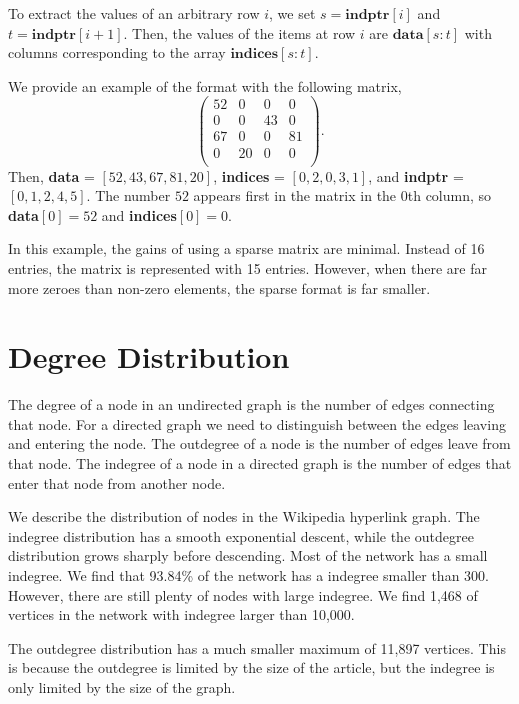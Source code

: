 \documentclass{article}
\begin{document}
To extract the values of an arbitrary row $i$, we set $s = \textbf{indptr}[i]$ and $t = \textbf{indptr}[i+1]$. Then, the values of the items at row $i$ are $\textbf{data}[s:t]$ with columns corresponding to the array $\textbf{indices}[s:t]$. 

We provide an example of the format with the following matrix,
\begin{equation*}
    \begin{pmatrix}
        52 & 0  & 0  & 0  \\
        0  & 0  & 43 & 0  \\
        67 & 0  & 0  & 81  \\
        0  & 20 & 0  & 0  \\
    \end{pmatrix}.
\end{equation*}
Then, \textbf{data} = $[52, 43, 67, 81, 20]$, \textbf{indices} = $[0, 2, 0, 3, 1]$, and \textbf{indptr} = $[0, 1, 2, 4, 5]$. The number $52$ appears first in the matrix in the 0th column, so \textbf{data}$[0] = 52$ and \textbf{indices}$[0] = 0$.

In this example, the gains of using a sparse matrix are minimal. Instead of 16 entries, the matrix is represented with 15 entries. However, when there are far more zeroes than non-zero elements, the sparse format is far smaller.


\section{Degree Distribution}

The degree of a node in an undirected graph is the number of edges connecting that node. For a directed graph we need to distinguish between the edges leaving and entering the node. 
The outdegree of a node is the number of edges leave from that node.
The indegree of a node in a directed graph is the number of edges that enter that node from another node.

We describe the distribution of nodes in the Wikipedia hyperlink graph.
The indegree distribution has a smooth exponential descent, while the outdegree distribution grows sharply before descending. 
Most of the network has a small indegree. We find that 93.84\% of the network has a indegree smaller than 300. However, there are still plenty of nodes with large indegree. We find 1,468 of vertices in the network with indegree larger than 10,000.

The outdegree distribution has a much smaller maximum of 11,897 vertices. This is because the outdegree is limited by the size of the article, but the indegree is only limited by the size of the graph.
\end{document}
